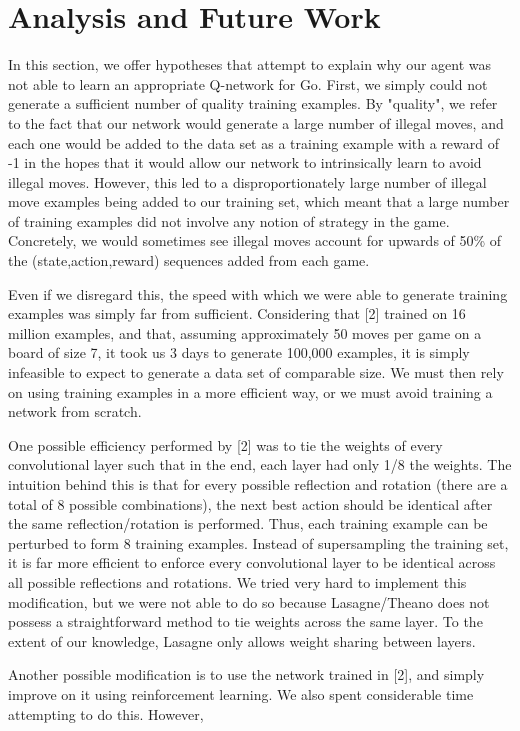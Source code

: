 \section{Analysis and Future Work}
In this section, we offer hypotheses that attempt to explain why our agent was not able to learn an appropriate Q-network for Go. First, we simply could not generate a sufficient number of quality training examples. By "quality", we refer to the fact that our network would generate a large number of illegal moves, and each one would be added to the data set as a training example with a reward of -1 in the hopes that it would allow our network to intrinsically learn to avoid illegal moves. However, this led to a disproportionately large number of illegal move examples being added to our training set, which meant that a large number of training examples did not involve any notion of strategy in the game. Concretely, we would sometimes see illegal moves account for upwards of 50\% of the (state,action,reward) sequences added from each game.

Even if we disregard this, the speed with which we were able to generate training examples was simply far from sufficient. Considering that [2] trained on 16 million examples, and that, assuming approximately 50 moves per game on a board of size 7, it took us 3 days to generate 100,000 examples, it is simply infeasible to expect to generate a data set of comparable size. We must then rely on using training examples in a more efficient way, or we must avoid training a network from scratch.

One possible efficiency performed by [2] was to tie the weights of every convolutional layer such that in the end, each layer had only 1/8 the weights. The intuition behind this is that for every possible reflection and rotation (there are a total of 8 possible combinations), the next best action should be identical after the same reflection/rotation is performed. Thus, each training example can be perturbed to form 8 training examples. Instead of supersampling the training set, it is far more efficient to enforce every convolutional layer to be identical across all possible reflections and rotations. We tried very hard to implement this modification, but we were not able to do so because Lasagne/Theano does not possess a straightforward method to tie weights across the same layer. To the extent of our knowledge, Lasagne only allows weight sharing between layers.

Another possible modification is to use the network trained in [2], and simply improve on it using reinforcement learning. We also spent considerable time attempting to do this. However, 